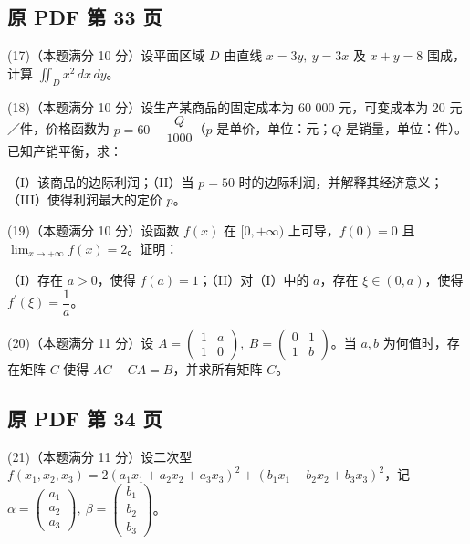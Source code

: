 \documentclass[UTF8,12pt]{ctexart}
\begin{document}
\clearpage

\subsection*{原 PDF 第 33 页}

(17)（本题满分 10 分）设平面区域 \(\displaystyle D\) 由直线 \(\displaystyle x=3y,\allowbreak \ y=3x\) 及 \(\displaystyle x+y=8\) 围成，计算 \(\displaystyle \iint_D x^2\,dx\,dy\)。


(18)（本题满分 10 分）设生产某商品的固定成本为 60 000 元，可变成本为 20 元／件，价格函数为 \(\displaystyle p=60-\dfrac{\displaystyle Q}{\displaystyle 1000}\)（\(\displaystyle p\) 是单价，单位：元；\(\displaystyle Q\) 是销量，单位：件）。已知产销平衡，求：


（I）该商品的边际利润；（II）当 \(\displaystyle p=50\) 时的边际利润，并解释其经济意义；（III）使得利润最大的定价 \(\displaystyle p\)。


(19)（本题满分 10 分）设函数 \(\displaystyle f(x)\) 在 \(\displaystyle [0,\allowbreak +\infty)\) 上可导，\(\displaystyle f(0)=0\) 且 \(\displaystyle \lim_{x\to+\infty}f(x)=2\)。证明：


（I）存在 \(\displaystyle a>0\)，使得 \(\displaystyle f(a)=1\)；（II）对（I）中的 \(\displaystyle a\)，存在 \(\displaystyle \xi\in(0,\allowbreak a)\)，使得 \(\displaystyle f^{\prime}(\xi)=\dfrac{\displaystyle 1}{\displaystyle a}\)。


(20)（本题满分 11 分）设 \(\displaystyle A=\begin{pmatrix}1&a\\1&0\end{pmatrix},\allowbreak \ B=\begin{pmatrix}0&1\\1&b\end{pmatrix}\)。当 \(\displaystyle a,\allowbreak b\) 为何值时，存在矩阵 \(\displaystyle C\) 使得 \(\displaystyle AC-CA=B\)，并求所有矩阵 \(\displaystyle C\)。


\clearpage

\subsection*{原 PDF 第 34 页}

(21)（本题满分 11 分）设二次型 \(\displaystyle f(x_1,\allowbreak x_2,\allowbreak x_3)=2(a_1x_1+a_2x_2+a_3x_3)^2+(b_1x_1+b_2x_2+b_3x_3)^2\)，记 \(\displaystyle \alpha=\begin{pmatrix}a_1\\a_2\\a_3\end{pmatrix},\allowbreak \ \beta=\begin{pmatrix}b_1\\b_2\\b_3\end{pmatrix}\)。
\end{document}
